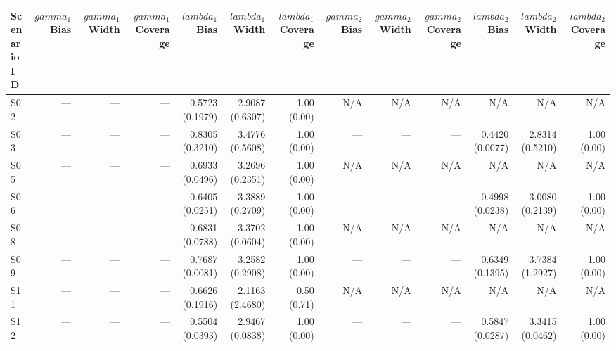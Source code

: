 \begin{tabular}{lrrrrrrrrrrrr}
\toprule
Scenario ID & $gamma_{1}$ Bias & $gamma_{1}$ Width & $gamma_{1}$ Coverage & $lambda_{1}$ Bias & $lambda_{1}$ Width & $lambda_{1}$ Coverage & $gamma_{2}$ Bias & $gamma_{2}$ Width & $gamma_{2}$ Coverage & $lambda_{2}$ Bias & $lambda_{2}$ Width & $lambda_{2}$ Coverage \\
\midrule
S02 & --- & --- & --- & 0.5723 (0.1979) & 2.9087 (0.6307) & 1.00 (0.00) & N/A & N/A & N/A & N/A & N/A & N/A \\
S03 & --- & --- & --- & 0.8305 (0.3210) & 3.4776 (0.5608) & 1.00 (0.00) & --- & --- & --- & 0.4420 (0.0077) & 2.8314 (0.5210) & 1.00 (0.00) \\
S05 & --- & --- & --- & 0.6933 (0.0496) & 3.2696 (0.2351) & 1.00 (0.00) & N/A & N/A & N/A & N/A & N/A & N/A \\
S06 & --- & --- & --- & 0.6405 (0.0251) & 3.3889 (0.2709) & 1.00 (0.00) & --- & --- & --- & 0.4998 (0.0238) & 3.0080 (0.2139) & 1.00 (0.00) \\
S08 & --- & --- & --- & 0.6831 (0.0788) & 3.3702 (0.0604) & 1.00 (0.00) & N/A & N/A & N/A & N/A & N/A & N/A \\
S09 & --- & --- & --- & 0.7687 (0.0081) & 3.2582 (0.2908) & 1.00 (0.00) & --- & --- & --- & 0.6349 (0.1395) & 3.7384 (1.2927) & 1.00 (0.00) \\
S11 & --- & --- & --- & 0.6626 (0.1916) & 2.1163 (2.4680) & 0.50 (0.71) & N/A & N/A & N/A & N/A & N/A & N/A \\
S12 & --- & --- & --- & 0.5504 (0.0393) & 2.9467 (0.0838) & 1.00 (0.00) & --- & --- & --- & 0.5847 (0.0287) & 3.3415 (0.0462) & 1.00 (0.00) \\
\bottomrule
\end{tabular}
